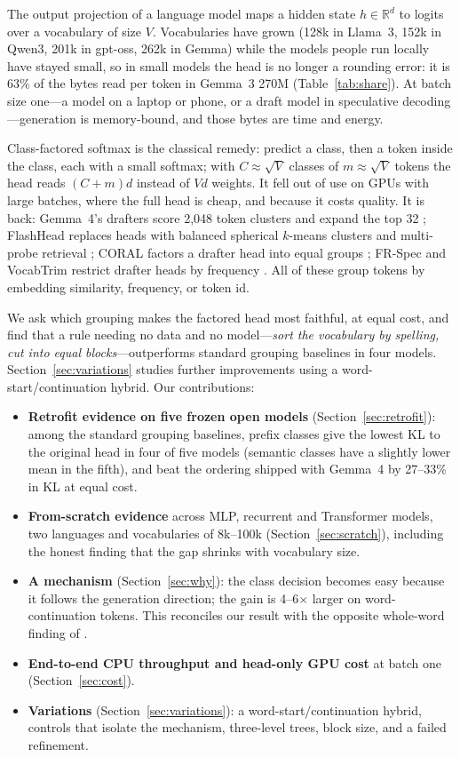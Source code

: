 \documentclass[11pt]{article}
\begin{document}
The output projection of a language model maps a hidden state $h\in\mathbb{R}^d$ to logits over a vocabulary of size $V$. Vocabularies have grown (128k in Llama~3, 152k in Qwen3, 201k in gpt-oss, 262k in Gemma) while the models people run locally have stayed small, so in small models the head is no longer a rounding error: it is 63\% of the bytes read per token in Gemma~3 270M (Table~\ref{tab:share}). At batch size one---a model on a laptop or phone, or a draft model in speculative decoding---generation is memory-bound, and those bytes are time and energy.

Class-factored softmax \citep{goodman2001classes,mikolov2011extensions} is the classical remedy: predict a class, then a token inside the class, each with a small softmax; with $C\approx\sqrt{V}$ classes of $m\approx\sqrt{V}$ tokens the head reads $(C+m)d$ instead of $Vd$ weights. It fell out of use on GPUs with large batches, where the full head is cheap, and because it costs quality. It is back: Gemma~4's drafters score 2{,}048 token clusters and expand the top 32 \citep{gemma4}; FlashHead replaces heads with balanced spherical $k$-means clusters and multi-probe retrieval \citep{flashhead}; CORAL factors a drafter head into equal groups \citep{coral}; FR-Spec and VocabTrim restrict drafter heads by frequency \citep{frspec,vocabtrim}. All of these group tokens by embedding similarity, frequency, or token id.

We ask which grouping makes the factored head most faithful, at equal cost, and find that a rule needing no data and no model---\emph{sort the vocabulary by spelling, cut into equal blocks}---outperforms standard grouping baselines in four models. Section~\ref{sec:variations} studies further improvements using a word-start/continuation hybrid. Our contributions:
\begin{itemize}
\item \textbf{Retrofit evidence on five frozen open models} (Section~\ref{sec:retrofit}): among the standard grouping baselines, prefix classes give the lowest KL to the original head in four of five models (semantic classes have a slightly lower mean in the fifth), and beat the ordering shipped with Gemma~4 by 27--33\% in KL at equal cost.
\item \textbf{From-scratch evidence} across MLP, recurrent and Transformer models, two languages and vocabularies of 8k--100k (Section~\ref{sec:scratch}), including the honest finding that the gap shrinks with vocabulary size.
\item \textbf{A mechanism} (Section~\ref{sec:why}): the class decision becomes easy because it follows the generation direction; the gain is 4--6$\times$ larger on word-continuation tokens. This reconciles our result with the opposite whole-word finding of \citet{jiang2017}.
\item \textbf{End-to-end CPU throughput and head-only GPU cost} at batch one (Section~\ref{sec:cost}).
\item \textbf{Variations} (Section~\ref{sec:variations}): a word-start/continuation hybrid, controls that isolate the mechanism, three-level trees, block size, and a failed refinement.
\end{itemize}
\end{document}
